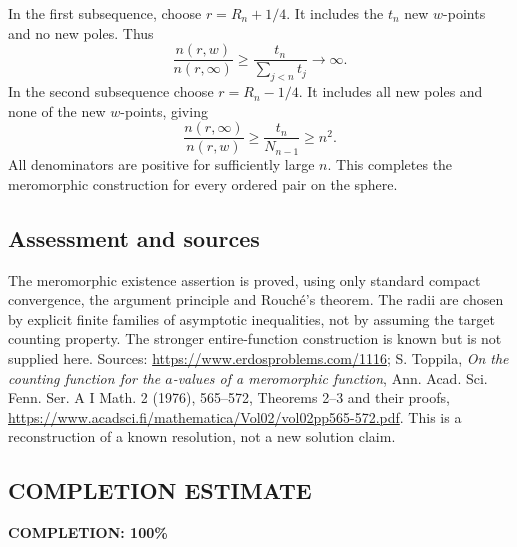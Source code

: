 In the first subsequence, choose $r=R_n+1/4$. It includes the $t_n$ new $w$-points and no new poles. Thus
\[
 \frac{n(r,w)}{n(r,\infty)}
 \ge\frac{t_n}{\sum_{j<n}t_j}\longrightarrow\infty.
\]
In the second subsequence choose $r=R_n-1/4$. It includes all new poles and none of the new $w$-points, giving
\[
 \frac{n(r,\infty)}{n(r,w)}
 \ge\frac{t_n}{N_{n-1}}\ge n^2.
\]
All denominators are positive for sufficiently large $n$. This completes the meromorphic construction for every ordered pair on the sphere.

\subsection*{Assessment and sources}
The meromorphic existence assertion is proved, using only standard compact convergence, the argument principle and Rouch\'e's theorem. The radii are chosen by explicit finite families of asymptotic inequalities, not by assuming the target counting property. The stronger entire-function construction is known but is not supplied here.
Sources: \url{https://www.erdosproblems.com/1116}; S. Toppila, \emph{On the counting function for the $a$-values of a meromorphic function}, Ann. Acad. Sci. Fenn. Ser. A I Math. 2 (1976), 565--572, Theorems 2--3 and their proofs, \url{https://www.acadsci.fi/mathematica/Vol02/vol02pp565-572.pdf}. This is a reconstruction of a known resolution, not a new solution claim.
\subsection*{COMPLETION ESTIMATE}
\textbf{COMPLETION: 100\%}
